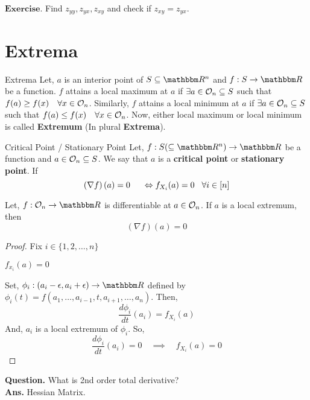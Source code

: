 \documentclass[Analysis-3]{subfiles}
\begin{document}
$\textbf{Exercise.}$ Find $z_{yy} , z_{yx} , z_{xy}$ and check if $z_{xy} = z_{yx}$.

\section{Extrema}

\begin{Def}{Extrema}{}
	Let, $a$ is an interior point of $S \subseteq \R^n$ and $f : S \to \R$ be a function. $f$ attains a local maximum at $a$ if $\exists a \in \mathcal{O}_{n} \subseteq S$ such that $f(a) \geq f(x) \quad \forall x \in \mathcal{O}_{n}$. Similarly, $f$ attains a local minimum at $a$ if $\exists a \in \mathcal{O}_{n} \subseteq S$ such that $f(a) \leq f(x) \quad \forall x \in \mathcal{O}_{n}$. Now, either local maximum or local minimum is called \textbf{Extremum} (In plural \textbf{Extrema}).
\end{Def}

\begin{Def}{Critical Point / Stationary Point}{}
	Let, $f : S (\subseteq \R^n) \to \R$ be a function and $a \in \mathcal{O}_{n} \subseteq S$. We say that $a$ is a \textbf{critical point} or \textbf{stationary point}.
	If \[ \left(\nabla f\right)(a) = 0 \hspace{5mm} \Leftrightarrow f_{X_i}(a) = 0 \hspace{3mm} \forall i \in [n] \]
\end{Def}

\begin{Thm}{}{}
	Let, $f: \Op{n} \to \R$ is differentiable at $a \in \mathcal{O}_{n}$. If $a$ is a local extremum, then \[ \left(\nabla f\right)(a) = 0 \]
\end{Thm}

\begin{proof}
	Fix $i \in \{1,2, \ldots, n\}$

	\begin{clmBox}
		$f_{x_i}(a) = 0$
	\end{clmBox}

	Set, $\phi_i : (a_i - \epsilon, a_i + \epsilon) \to \R$ defined by $\phi_i(t) = f(a_1, \ldots, a_{i-1}, t, a_{i+1}, \ldots, a_n)$. Then, \[ \frac{d \phi_i}{dt}(a_i) = f_{X_i}(a) \]
	And, $a_i$ is a local extremum of $\phi_i$. So, \[ \frac{d \phi_i}{dt}(a_i) = 0 \quad \implies \quad f_{X_i}(a) = 0 \]
\end{proof}


\textbf{Question.} What is 2nd order total derivative? \\
\textbf{Ans.} Hessian Matrix.
\end{document}
